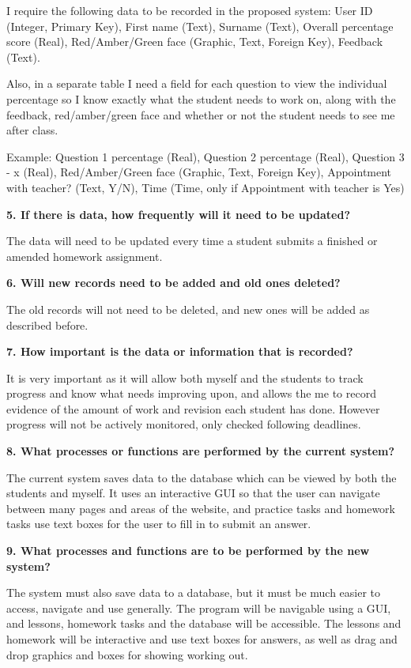 I require the following data to be recorded in the proposed system: User ID (Integer, Primary Key), First name (Text), Surname (Text), Overall percentage score (Real), Red/Amber/Green face (Graphic, Text, Foreign Key), Feedback (Text).

Also, in a separate table I need a field for each question to view the individual percentage so I know exactly what the student needs to work on, along with the feedback, red/amber/green face and whether or not the student needs to see me after class. 

Example: Question 1 percentage (Real), Question 2 percentage (Real), Question 3 - x (Real), Red/Amber/Green face (Graphic, Text, Foreign Key), Appointment with teacher? (Text, Y/N), Time (Time, only if Appointment with teacher is Yes)

\textbf{5. If there is data, how frequently will it need to be updated?}

The data will need to be updated every time a student submits a finished or amended homework assignment.

\textbf{6. Will new records need to be added and old ones deleted?}

The old records will not need to be deleted, and new ones will be added as described before.

\textbf{7. How important is the data or information that is recorded?}

It is very important as it will allow both myself and the students to track progress and know what needs improving upon, and allows the me to record evidence of the amount of work and revision each student has done. However progress will not be actively monitored, only checked following deadlines.

\textbf{8. What processes or functions are performed by the current system?}

The current system saves data to the database which can be viewed by both the students and myself. It uses an interactive GUI so that the user can navigate between many pages and areas of the website, and practice tasks and homework tasks use text boxes for the user to fill in to submit an answer.

\textbf{9. What processes and functions are to be performed by the new system?}

The system must also save data to a database, but it must be much easier to access, navigate and use generally. The program will be navigable using a GUI, and lessons, homework tasks and the database will be accessible. The lessons and homework will be interactive and use text boxes for answers, as well as drag and drop graphics and boxes for showing working out.

